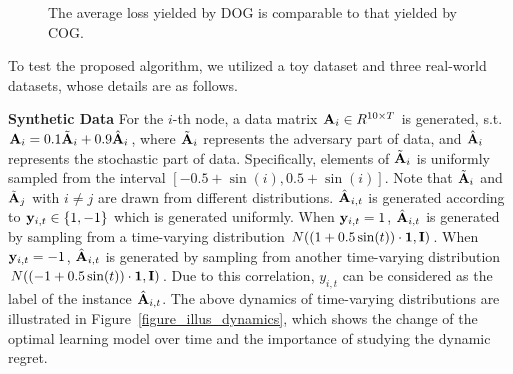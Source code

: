 \documentclass{article}
\begin{document}
\begin{figure}[!h]
\caption{The average loss yielded by DOG is comparable to that yielded by COG.}
\label{figure_compare_loss}
\end{figure}




To test the proposed algorithm, we utilized a toy dataset and three real-world datasets, whose details are as follows.

\textbf{Synthetic Data} 
For the $i$-th node, a data matrix  ${\bf A}_i\in R^{10\times T}$ is generated, s.t. ${\bf A}_i=0.1\tilde{{\bf A}}_i+0.9\hat{{\bf A}}_i$, where $\tilde{{\bf A}}_i$ represents the adversary part of data, and $\hat{{\bf A}}_i$ represents the stochastic part of data. Specifically,  elements of $\tilde{{\bf A}}_i$ is uniformly sampled from the interval $[-0.5+\sin(i),0.5+\sin(i)]$. Note that $\tilde{{\bf A}}_i$ and $\tilde{{\bf A}}_j$ with $i\neq j$ are drawn from different distributions. $\hat{{\bf A}}_{i,t}$ is generated according to ${\bf y}_{i,t}\in\{1,-1\}$ which is generated uniformly. When ${\bf y}_{i,t}=1$, $\hat{{\bf A}}_{i,t}$ is generated by sampling from a time-varying distribution $N((1+0.5\sin(t))\cdot{\bf 1}, {\bf I})$. When ${\bf y}_{i,t} = -1$, $\hat{{\bf A}}_{i,t}$ is generated by sampling from another time-varying distribution $N((-1+0.5\sin(t))\cdot{\bf 1}, {\bf I})$. Due to this correlation, $y_{i,t}$ can be considered as the label of the instance $\hat{{\bf A}}_{i,t}$.
The above dynamics of time-varying distributions are illustrated in Figure~\ref{figure_illus_dynamics}, which shows the change of the optimal learning model over time and the importance of studying the dynamic regret. 
\end{document}
